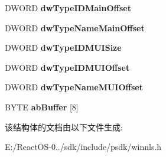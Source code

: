 \begin{DoxyCompactItemize}
D\+W\+O\+RD {\bfseries dw\+Type\+I\+D\+Main\+Offset}
\item 
\mbox{\label{struct___f_i_l_e_m_u_i_i_n_f_o_a2582c001ea36a2e2ed257709ee19b3d4}} 
D\+W\+O\+RD {\bfseries dw\+Type\+Name\+Main\+Offset}
\item 
\mbox{\label{struct___f_i_l_e_m_u_i_i_n_f_o_a41e8ba6e73e71ca852786c9f3061a7e7}} 
D\+W\+O\+RD {\bfseries dw\+Type\+I\+D\+M\+U\+I\+Size}
\item 
\mbox{\label{struct___f_i_l_e_m_u_i_i_n_f_o_a4aa03896472d32d714a6ca4b907d138f}} 
D\+W\+O\+RD {\bfseries dw\+Type\+I\+D\+M\+U\+I\+Offset}
\item 
\mbox{\label{struct___f_i_l_e_m_u_i_i_n_f_o_ac088bc5f7dd8940ad278621639386308}} 
D\+W\+O\+RD {\bfseries dw\+Type\+Name\+M\+U\+I\+Offset}
\item 
\mbox{\label{struct___f_i_l_e_m_u_i_i_n_f_o_a75882c43c5c0da7084ea9714e27f5306}} 
B\+Y\+TE {\bfseries ab\+Buffer} \mbox{[}8\mbox{]}
\end{DoxyCompactItemize}


该结构体的文档由以下文件生成\+:\begin{DoxyCompactItemize}
\item 
E\+:/\+React\+O\+S-\/0../sdk/include/psdk/winnls.\+h\end{DoxyCompactItemize}
